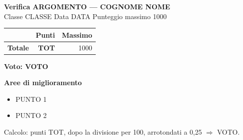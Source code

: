 \documentclass[9pt,a4paper]{article}
\makeatletter
\newcommand{\ok}{\item[{\color{okverde}\ding{51}}]}
\newcommand{\ko}{\item[{\color{kosso}\ding{55}}]}
\newcommand{\esito}[2]{%
  \begin{tabularx}{\linewidth}{@{}X@{\hspace{6pt}}X@{}}
    \begin{minipage}[t]{\linewidth}\textbf{\color{okverde}Corretto}\begin{itemize}[label={}] #1\end{itemize}\end{minipage} &
    \begin{minipage}[t]{\linewidth}\textbf{\color{kosso}Errori e mancanze}\begin{itemize}[label={}] #2\end{itemize}\end{minipage}
  \end{tabularx}}
\newcommand{\esercizio}[2]{\par\medskip\textbf{Esercizio #1}\hfill #2\par}
\makeatother
\begin{document}
{\Large\bfseries Verifica \textsc{ARGOMENTO} --- COGNOME NOME}\\
Classe CLASSE \quad Data DATA \quad Punteggio massimo 1000

\medskip
\begin{tabular}{@{}lrr@{}}\toprule
 & Punti & Massimo\\\midrule
 \midrule \textbf{Totale} & \textbf{TOT} & 1000\\\bottomrule
\end{tabular}
\hfill {\Large\bfseries Voto: VOTO}


\medskip\textbf{Aree di miglioramento}
\begin{itemize}[label=$\rightarrow$]
 \item PUNTO 1
 \item PUNTO 2
\end{itemize}

{\small Calcolo: punti TOT, dopo la divisione per 100, arrotondati a 0,25 \(\Rightarrow\) VOTO.}
\end{document}
